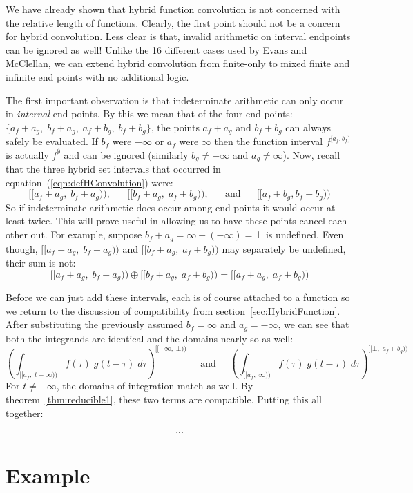 We have already shown that hybrid function convolution is not concerned with the relative length of functions. 
Clearly, the first point should not be a concern for hybrid convolution.
Less clear is that, invalid arithmetic on interval endpoints can be ignored as well!
Unlike the 16 different cases used by Evans and McClellan, we can extend hybrid convolution from finite-only to mixed
finite and infinite end points with no additional logic.


The first important observation is that indeterminate arithmetic can only occur in \emph{internal} end-points.
By this we mean that of the four end-points: $\{ a_f+a_g, \; b_f+a_g, \; a_f+b_g, \; b_f+b_g \}$, the points $a_f+a_g$
and $b_f+b_g$ can always safely be evaluated.
If $b_f$ were $-\infty$ or $a_f$ were $\infty$ then the function interval $f^{[a_f,b_f)}$ is actually $f^\emptyset$ and
can be ignored (similarly $b_g \neq -\infty$ and $a_g \neq \infty$).
Now, recall that the three hybrid set intervals that occurred in equation~(\ref{eqn:defHConvolution}) were:
\begin{equation*}
	[\![a_f+a_g, \; b_f+a_g)\!), 
	\;\;\;\;\;\; [\![b_f+a_g, \; a_f+b_g )\!), 
	\;\;\;\;\;\; \text{and} 
	\;\;\;\;\;\; [\![a_f+b_g, b_f+b_g)\!)
\end{equation*}
So if indeterminate arithmetic does occur among end-points it would occur at least twice.
This will prove useful in allowing us to have these points cancel each other out.
For example, suppose $b_f+a_g = \infty+(-\infty) =\bot$ is undefined.
Even though, $[\![a_f+a_g, \; b_f+a_g)\!)$ and ${[\![b_f+a_g, \; a_f+b_g )\!)}$ may separately be undefined, 
their sum is not:
\begin{equation*}
	[\![a_f+a_g, \; b_f+a_g)\!) \oplus [\![b_f+a_g, \; a_f+b_g )\!) = [\![a_f+a_g, \;a_f+b_g)\!)
\end{equation*}


Before we can just add these intervals, each is of course attached to a function so we return to the discussion of compatibility
from section~\ref{sec:HybridFunction}.
After substituting the previously assumed $b_f = \infty$ and $a_g=-\infty$, we can see that both the integrands are
identical and the domains nearly so as well:
\begin{equation*}
	\left( \int_{[\![a_f,\;t+\infty)\!)} f(\tau) \; g(t-\tau) \; d\tau \right)^{[\![-\infty,\; \bot )\!)} 
		\;\;\;\;\;
		\text{and}
		\;\;\;\;\;
	\left( \int_{[\![a_f,\;\infty)\!)} f(\tau) \; g(t-\tau) \; d\tau \right)^{[\![\bot,\; a_f+b_g)\!)} 
\end{equation*}
For $t \neq -\infty$, the domains of integration match as well.
By theorem~\ref{thm:reducible1}, these two terms are compatible.
Putting this all together:

\begin{align}
 ...
\end{align}

%
%
\section{Example}

\newpage